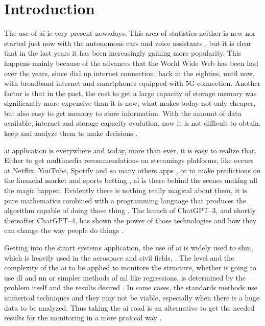 \chapter{Introduction}

The use of \gls*{ai} is very present nowadays. This area of statistics neither is new nor started just now with the autonomous cars and voice assistants \citep{muthukrishnan2020}, but it is clear that in the last years it has been increasingly gaining more popularity. This happens mainly because of the advances that the World Wide Web has been had over the years, since dial up internet connection, back in the eighties, until now, with broadband internet and smartphones equipped with 5G connection. Another factor is that in the past, the cost to get a large capacity of storage memory was significantly more expensive than it is now, what makes today not only cheaper, but also easy to get memory to store information. With the amount of data available, internet and storage capacity evolution, now it is not difficult to obtain, keep and analyze them to make decisions \citep{goda2012}.

\gls*{ai} application is everywhere and today, more than ever, it is easy to realize that. Either to get multimedia recommendations on streamings platforms, like occurs at Netflix, YouTube, Spotify and so many others apps \citep{chan-olmsted2019}, or to make predictions on the financial market and sports betting \citep{milana2021,kollar2021,hubacek2019}, \gls*{ai} is there behind the scenes making all the magic happen. Evidently there is nothing really magical about them, it is pure mathematics combined with a programming language that produces the algorithm capable of doing those thing \citep{goodfellow2016,aurelien2022,raschka2015}. The launch of ChatGPT--3, and shortly thereafter ChatGPT--4, has shown the power of those technologies and how they can change the way people do things \citep{biswas2023,biswas2023a, lund2023,baidoo-anu2023}.

Getting into the smart systems application, the use of \gls*{ai} is widely used to \gls*{shm}, which is heavily used in the aerospace and civil fields, \citep{azimi2020,ye2019}. The level and the complexity of the \gls*{ai} to be applied to monitore the structure, whether is going to use \gls*{dl} and \gls*{nn} or simpler methods of \gls*{ml} like regressions, is determined by the problem itself and the results desired \citep{farrar2012}. In some cases, the standards methods use numerical techniques and they may not be viable, especially when there is a huge data to be analyzed. Thus taking the \gls*{ai} road is an alternative to get the needed results for the monitoring in a more pratical way \citep{smarsly2007,sun2020}. 

